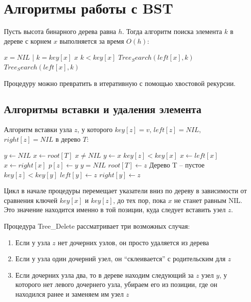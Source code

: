 \documentclass[11pt]{article}
\begin{document}
\section{Алгоритмы работы с BST}
Пусть высота бинарного дерева равна $h$. Тогда алгоритм поиска элемента $k$ в дереве с корнем $x$ выполняется за время $O(h)$:
\begin{codebox}
\li \If $x = NIL$ | $k = key[x]$
\li \Then \Return $x$
\End
\li \If $k < key[x]$
\li \Then \Return $Tree_Search(left[x], k)$
\li \Else \Return $Tree_Search(left[x], k)$
\End
\end{codebox}
Процедуру можно превратить в итеративную с помощью хвостовой рекурсии.

\subsection{Алгоритмы вставки и удаления элемента}
Алгоритм вставки узла $z$, у которого $key[z] = v$, $left[z] = NIL$, $right[z] = NIL$ в дерево $T$:
\begin{codebox}
\li $y \gets NIL$
\li $x \gets root[T]$
\li \While $x \neq NIL$
\li   \Do $y \gets x$
\li     \If $key[z] < key[x]$
\li       \Then $x \gets left[x]$
\li       \Else $x \gets right[x]$
  \End
\End
\li $p[z] \gets y$
\li \If $y = NIL$
\li   \Then $root[T] \gets z$ \Comment Дерево T -- пустое
\li   \Else \If $key[z] < key[y]$
\li       \Then $left[y] \gets z$
\li       \Else $right[y] \gets z$
  \End
\End
\end{codebox}

Цикл в начале процедуры перемещает указатели вниз по дереву в зависимости от сравнения ключей $key[x]$ и $key[z]$, до тех пор, пока $x$ не станет равным NIL. Это значение находится именно в той позиции, куда следует вставить узел $z$.

Процедура Tree\_Delete рассматривает три возможных случая:
\begin{enumerate}
\item Если у узла $z$ нет дочерних узлов, он просто удаляется из дерева
\item Если у узла один дочерний узел, он ``склеивается'' с родительским для $z$
\item Если дочерних узла два, то в дереве находим следующий за $z$ узел $y$, у которого нет левого дочернего узла, убираем его из позиции, где он находился ранее и заменяем им узел $z$
\end{enumerate}
\end{document}
